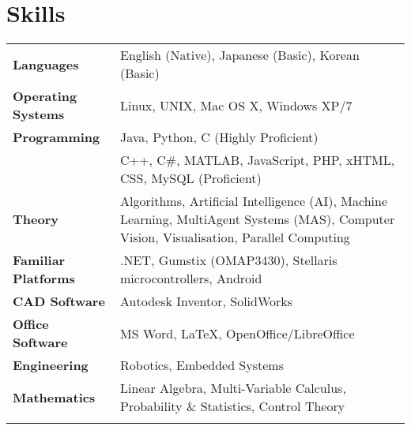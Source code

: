 \documentclass[10pt, a4paper]{report}
\begin{document}
\section*{Skills}

\begin{tabular}{lp{14cm}}
{\bf Languages} & English (Native), Japanese (Basic), Korean (Basic)\\  \addlinespace
{\bf Operating Systems} &  Linux, UNIX, Mac OS X, Windows XP/7 \\  \addlinespace
{\bf Programming} &  Java, Python, C (Highly Proficient) \\  \addlinespace
{\bf } &  C++, C\#, MATLAB, JavaScript, PHP, xHTML, CSS, MySQL (Proficient) \\  \addlinespace
{\bf Theory} & Algorithms, Artificial Intelligence (AI), Machine Learning, Multi\-Agent Systems (MAS), Computer Vision, Visualisation, Parallel Computing \\  \addlinespace
{\bf Familiar Platforms} & .NET, Gumstix (OMAP3430), Stellaris microcontrollers, Android \\ \addlinespace
{\bf CAD Software} & Autodesk Inventor, SolidWorks \\  \addlinespace
{\bf Office Software} & MS Word, \LaTeX , OpenOffice/LibreOffice \\  \addlinespace
{\bf Engineering} & Robotics, Embedded Systems \\  \addlinespace
{\bf Mathematics} & Linear Algebra,  Multi-Variable Calculus, Probability \& Statistics, Control Theory \\  \addlinespace
\end{tabular}
\end{document}
